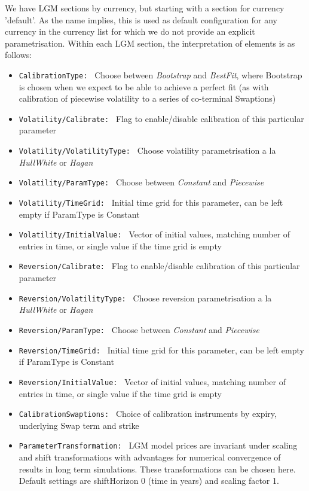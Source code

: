 \documentclass[12pt, a4paper]{article}
\begin{document}
We have LGM sections by currency, but starting with a section for currency 'default'. As the name implies, this is used
as default configuration for any currency in the currency list for which we do not provide an explicit
parametrisation. Within each LGM section, the interpretation of elements is as follows:

\begin{itemize}
\item {\tt CalibrationType: } Choose between {\em Bootstrap} and {\em BestFit}, where Bootstrap is chosen when we expect
to be able to achieve a perfect fit (as with calibration of piecewise volatility to a series of co-terminal Swaptions)
\item {\tt Volatility/Calibrate: } Flag to enable/disable calibration of this particular parameter
\item {\tt Volatility/VolatilityType: } Choose volatility parametrisation a la {\em HullWhite} or {\em Hagan}
\item {\tt Volatility/ParamType: } Choose between {\em Constant} and {\em Piecewise}
\item {\tt Volatility/TimeGrid: } Initial time grid for this parameter, can be left empty if ParamType is Constant
\item {\tt Volatility/InitialValue: } Vector of initial values, matching number of entries in time, or single value if
the time grid is empty
\item {\tt Reversion/Calibrate: } Flag to enable/disable calibration of this particular parameter
\item {\tt Reversion/VolatilityType: } Choose reversion parametrisation a la {\em HullWhite} or {\em Hagan}
\item {\tt Reversion/ParamType: } Choose between {\em Constant} and {\em Piecewise}
\item {\tt Reversion/TimeGrid: } Initial time grid for this parameter, can be left empty if ParamType is Constant
\item {\tt Reversion/InitialValue: } Vector of initial values, matching number of entries in time, or single value if
the time grid is empty
\item {\tt CalibrationSwaptions: } Choice of calibration instruments by expiry, underlying Swap term and strike
\item {\tt ParameterTransformation: } LGM model prices are invariant under scaling and shift transformations
\cite{Lichters} with advantages for numerical convergence of results in long term simulations. These transformations can
be chosen here. Default settings are shiftHorizon 0 (time in years) and scaling factor 1.
\end{itemize}
\end{document}
